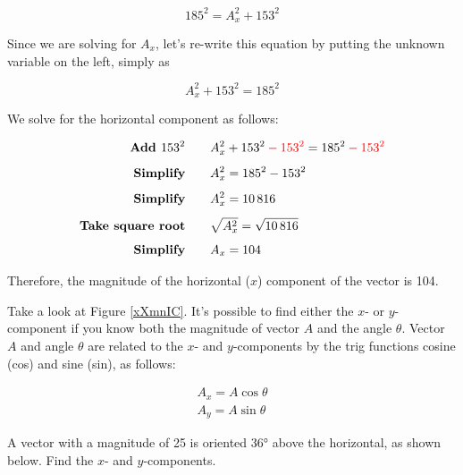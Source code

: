 \documentclass[main.tex]{subfiles}
\begin{document}
\begin{equation*}
    185^2 = A_x^2 + 153^2
\end{equation*}

Since we are solving for $A_x$, let's re-write this equation by putting the unknown variable on the left, simply as 

\begin{equation*}
    A_x^2 + 153^2 = 185^2
\end{equation*}

We solve for the horizontal component as follows:

\begin{align*}
    \textbf{Add $153^2$} \qquad & A_x^2 + 153^2 \mathbin{\color{red} -} \textcolor{red}{153^2} = 185^2 \mathbin{\color{red} -} \textcolor{red}{153^2}\\[1ex]
    \textbf{Simplify} \qquad & A_x^2 = 185^2 - 153^2\\[1ex]
    \textbf{Simplify} \qquad & A_x^2 = \num{10816}\\[1ex]
    \textbf{Take square root} \qquad & \sqrt{A_x^2} = \sqrt{\num{10816}}\\[1ex]
    \textbf{Simplify} \qquad & A_x = 104
\end{align*}

Therefore, the magnitude of the horizontal ($x$) component of the vector is 104.

\solutionEnd

Take a look at Figure \ref{xXmnIC}. It's possible to find either the $x$- or $y$-component if you know both the magnitude of vector $A$ and the angle $\theta$. Vector $A$ and angle $\theta$ are related to the $x$- and $y$-components by the trig functions cosine (cos) and sine (sin), as follows:

\begin{align}
    A_x = A \cos{\theta} \label{06CyUc}\\[1ex]
    A_y = A \sin{\theta} \label{aBWDIc}
\end{align}

\begin{example}
    A vector with a magnitude of 25 is oriented \ang{36} above the horizontal, as shown below. Find the $x$- and $y$-components.
\end{example}

\begin{center}
\end{center}
\end{document}
